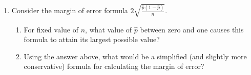 \begin{enumerate}
\item Consider the margin of error formula $\displaystyle 2 \sqrt{\frac{\hat{p}(1-\hat{p})}{n}}$.
\begin{enumerate}
	\item For fixed value of $n$, what value of $\hat{p}$ between zero and one causes this formula to attain its largest possible value? \vfill
	\item Using the answer above, what would be a simplified (and slightly more conservative) formula for calculating the margin of error? \vfill
\end{enumerate}


\end{enumerate}



\HOMEWORK 
